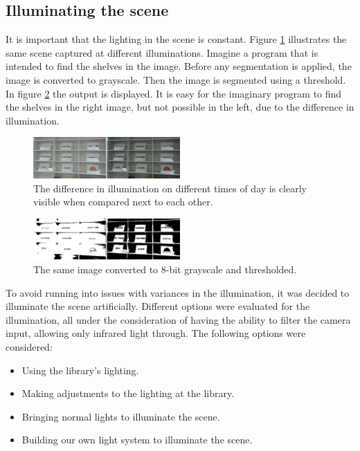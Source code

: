 
\subsection{Illuminating the scene}

It is important that the lighting in the scene is constant. Figure \ref{fig:scene_light} illustrates the same scene captured at different illuminations. Imagine a program that is intended to find the shelves in the image. Before any segmentation is applied, the image is converted to grayscale. Then the image is segmented using a threshold. In figure \ref{fig:scene_thresholded} the output is displayed. It is easy for the imaginary program to find the shelves in the right image, but not possible in the left, due to the difference in illumination.  

\begin{figure}[htbp] 
\centering 
\includegraphics[width=0.5\textwidth]{Pictures/HjoerringLibrary/scene_lighting.png} 
\caption{The difference in illumination on different times of day is clearly visible when compared next to each other.} 
\label{fig:scene_light} 
\end{figure}

\begin{figure}[htbp] 
\centering 
\includegraphics[width=0.5\textwidth]{Pictures/HjoerringLibrary/scene_lighting_thresholded.png} 
\caption{The same image converted to 8-bit grayscale and thresholded.} 
\label{fig:scene_thresholded} 
\end{figure}

To avoid running into issues with variances in the illumination, it was decided to illuminate the scene artificially. Different options were evaluated for the illumination, all under the consideration of having the ability to filter the camera input, allowing only infrared light through. The following options were considered:

\begin{itemize}
\item Using the library's lighting.
\item Making adjustments to the lighting at the library.
\item Bringing normal lights to illuminate the scene.
\item Building our own light system to illuminate the scene.
\end{itemize}

